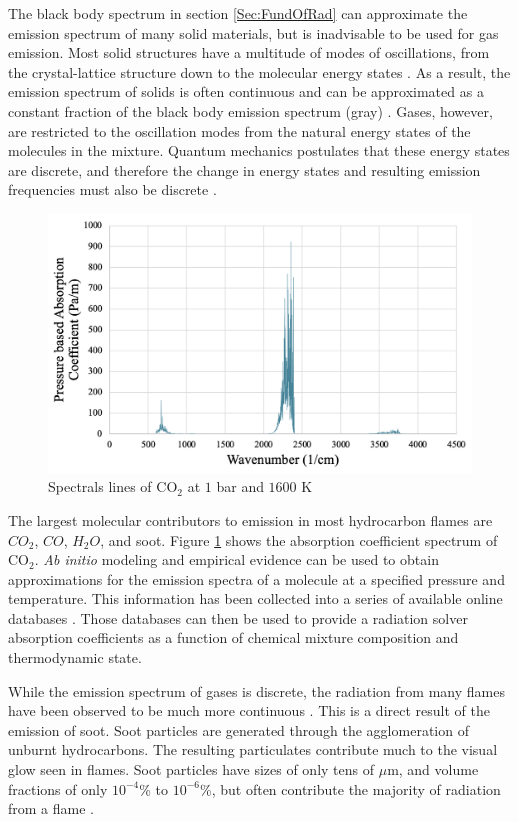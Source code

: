 The black body spectrum in section \ref{Sec:FundOfRad} can approximate the emission spectrum of many solid materials, but is inadvisable to be used for gas emission. 
Most solid structures have a multitude of modes of oscillations, from the crystal-lattice structure down to the molecular energy states \cite{Viskanta1975HeatSolids}. As a result, the emission spectrum of solids is often continuous and can be approximated as a constant fraction of the black body emission spectrum (gray) \cite{Howell2010ThermalTransfer}. 
Gases, however, are restricted to the oscillation modes from the natural energy states of the molecules in the mixture. Quantum mechanics postulates that these energy states are discrete, and therefore the change in energy states and resulting emission frequencies must also be discrete \cite{Hanson2016SpectroscopyGases}.
\begin{figure}
\centering
\includegraphics[width=0.8\linewidth]{figures/ch2/SpectralLinesCO2.png}
\caption{Spectrals lines of CO$_2$ at $1$ bar and $1600$ K }
\label{fig:SpectralLines}
\end{figure}


The largest molecular contributors to emission in most hydrocarbon flames are $CO_2$, $CO$, $H_2O$, and soot. Figure \ref{fig:SpectralLines} shows the absorption coefficient spectrum of CO$_2$. 
\textit{Ab initio} modeling and empirical evidence can be used to obtain approximations for the emission spectra of a molecule at a specified pressure and temperature. This information has been collected into a series of available online databases \cite{Rothman2010HITEMPDatabase}. 
Those databases can then be used to provide a radiation solver absorption coefficients as a function of chemical mixture composition and thermodynamic state.

While the emission spectrum of gases is discrete, the radiation from many flames have been observed to be much more continuous \cite{Modest2013RadiativeTransfer}. This is a direct result of the emission of soot.
Soot particles are generated through the agglomeration of unburnt hydrocarbons. The resulting particulates contribute much to the visual glow seen in flames. 
Soot particles have sizes of only tens of $\mu{}$m, and volume fractions of only $10^{-4}$\% to $10^{-6}$\%, but often contribute the majority of radiation from a flame \cite{Modest2013RadiativeTransfer}.

